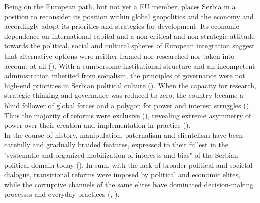 \documentclass[11pt]{report}
\begin{document}
{{{{Being on the European path, but not yet a EU member, places Serbia in a position to reconsider its position within global geopolitics and the economy and accordingly adopt its priorities and strategies for development. Its economic dependence on international capital and a non-critical and non-strategic attitude towards the political, social and cultural spheres of European integration suggest that alternative options were neither framed nor researched nor taken into account at all (\href{Vujosevic}{\citealt{vujosevic_post-socialist_2012}}).
With a cumbersome institutional structure and an incompetent administration inherited from socialism, the principles of governance were not high-end priorities in Serbian political culture  (\href{Trkulja}{\citealt{trkulja_serbian_2012}}).
When the capacity for research, strategic thinking and governance was reduced to zero, the country became a blind follower of global forces and a polygon for power and interest struggles (\href{Vujosevic}{\citealt{vujosevic_conundrum_2012}}).
Thus the majority of reforms were exclusive (\href{Vujosevic}{\citealt{vujosevic_novi_2012}}), revealing extreme asymmetry of power over their creation and implementation in practice (\href{Vujosevic}{\citealt{vujosevic_regionalizam_2015}}).
\\

In the course of history, manipulation, paternalism and clientelism have been carefully and gradually braided features, expressed to their fullest in the "systematic and organized mobilization of interests and bias" of the Serbian political domain today (\href{Vujosevic}{\citealt{vujosevic_post-socialist_2012}}).
In sum, with the lack of broader political and societal dialogue, transitional reforms were imposed by political and economic elites, while the corruptive channels of the same elites have dominated decision-making processes and everyday practices (\href{Vujosevic}{\citealt{vujosevic_conundrum_2012}}, \href{Vujosevic}{\citealt{vujosevic_novi_2012}}).%
\\

}}}}
\end{document}
